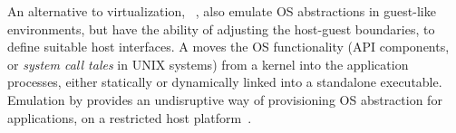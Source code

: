 


An alternative to virtualization,
\term{\liboses{}}~\citep{porter11drawbridge,unikernels,baumann13bascule},
also emulate OS abstractions in guest-like environments,
but have the ability of adjusting the host-guest boundaries, to define suitable host interfaces.
A \libos{} moves the OS functionality
(API components, or \emph{system call tales} in UNIX systems)
from a kernel into the application processes,
either statically or dynamically linked into a standalone executable.
Emulation by \liboses{}
provides an undisruptive way of provisioning OS abstraction for applications,
on a restricted host platform~\citep{baumann14haven}.


